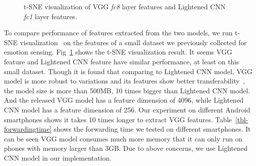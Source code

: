 \begin{figure}[!htbp]
    \caption{t-SNE visualization of VGG \emph{fc8} layer features and Lightened CNN \emph{fc1} layer features.}
    \label{fig:ch4-tsnevggvsmfm}
\end{figure}

To compare performance of features extracted from the two models, we run t-SNE visualization~\cite{maaten2008visualizing} on the features of a small dataset we previously collected for emotion sensing. Fig~\ref{fig:ch4-tsnevggvsmfm} shows the t-SNE visualization result. It seems VGG feature and Lightened CNN feature have similar performance, at least on this small dataset. Though it is found that comparing to Lightened CNN model, VGG model is more robust to variations and its features show better transferability~\cite{ghazi2016comprehensive}, the model size is more than 500MB, 10 times bigger than Lightened CNN model. And the released VGG model has a feature dimension of 4096, while Lightened CNN model has a feature dimension of 256. Our experiment on different Android smartphones shows it takes 10 times longer to extract VGG features. Table~\ref{tbl-forwardingtime} shows the forwarding time we tested on different smartphones. It can be seen VGG model consumes much more memory that it can only run on phones with memory larger than 3GB. Due to above concerns, we use Lightened CNN model in our implementation.

